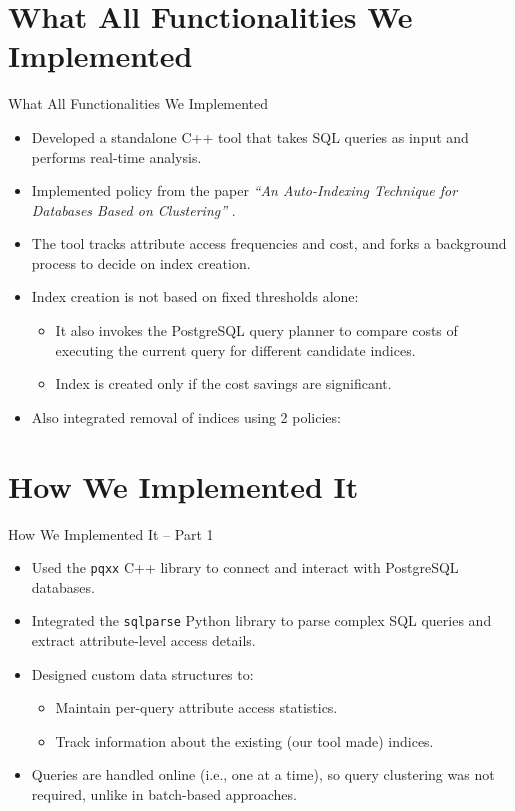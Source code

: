 \documentclass[Serif, 10pt, brown]{beamer}
\theoremstyle{example}
\theoremstyle{plain}
\begin{document}
\section{What All Functionalities We Implemented}
\begin{frame}{What All Functionalities We Implemented}
	\begin{itemize}
		\item Developed a standalone C++ tool that takes SQL queries as input and performs real-time analysis.
		\item Implemented policy from the paper \textit{``An Auto-Indexing Technique for Databases Based on Clustering''} \cite{1333569}.
		\item The tool tracks attribute access frequencies and cost, and forks a background process to decide on index creation.
		\item Index creation is not based on fixed thresholds alone:
		\begin{itemize}
			\item It also invokes the PostgreSQL query planner to compare costs of executing the current query for different candidate indices.
			\item Index is created only if the cost savings are significant.
		\end{itemize}
		\item Also integrated removal of indices using 2 policies:
	\end{itemize}
\end{frame}

\section{How We Implemented It}
\begin{frame}{How We Implemented It – Part 1}
	\begin{itemize}
		\item Used the \texttt{pqxx} C++ library to connect and interact with PostgreSQL databases.
		\item Integrated the \texttt{sqlparse} Python library to parse complex SQL queries and extract attribute-level access details.
		\item Designed custom data structures to:
		\begin{itemize}
			\item Maintain per-query attribute access statistics.
			\item Track information about the existing (our tool made) indices.
		\end{itemize}
		\item Queries are handled online (i.e., one at a time), so query clustering was not required, unlike in batch-based approaches.
	\end{itemize}
\end{frame}
\end{document}
